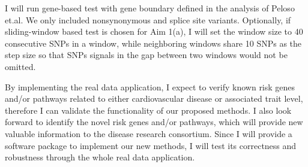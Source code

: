 \documentclass[12pt]{article}
\begin{document}
I will run gene-based test with gene boundary defined in the analysis of Peloso et.al.\cite{Peloso2014} We only included nonsynonymous and splice site variants.
Optionally, if sliding-window based test is chosen for Aim 1(a), I will set the window size to 40 consecutive SNPs in a window, while neighboring windows share 10 SNPs as the step size so that SNPs signals in the gap between two windows would not be omitted. 

By implementing the real data application, I expect to verify known risk genes and/or pathways related to either cardiovascular disease or associated trait level, therefore I can validate the functionality of our proposed methods. I also look forward to identify the novel risk genes and/or pathways, which will provide new valuable information to the disease research consortium. Since I will provide a software package to implement our new methods, I will test its correctness and robustness through the whole real data application.  



\end{document}
